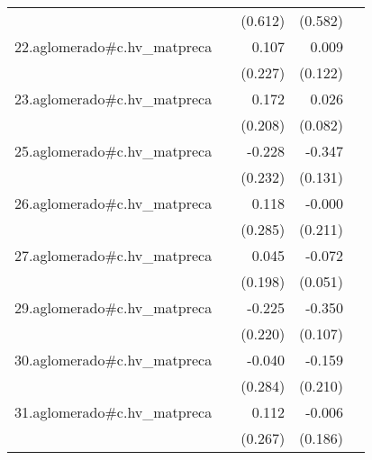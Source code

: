 {\begin{longtable}{l*{4}{D{.}{.}{-1}}}
            &                     &     (0.612)         &     (0.582)         &                     \\
\addlinespace
22.aglomerado#c.hv\_matpreca&                     &       0.107         &       0.009         &                     \\
            &                     &     (0.227)         &     (0.122)         &                     \\
\addlinespace
23.aglomerado#c.hv\_matpreca&                     &       0.172         &       0.026         &                     \\
            &                     &     (0.208)         &     (0.082)         &                     \\
\addlinespace
25.aglomerado#c.hv\_matpreca&                     &      -0.228         &      -0.347\sym{**} &                     \\
            &                     &     (0.232)         &     (0.131)         &                     \\
\addlinespace
26.aglomerado#c.hv\_matpreca&                     &       0.118         &      -0.000         &                     \\
            &                     &     (0.285)         &     (0.211)         &                     \\
\addlinespace
27.aglomerado#c.hv\_matpreca&                     &       0.045         &      -0.072         &                     \\
            &                     &     (0.198)         &     (0.051)         &                     \\
\addlinespace
29.aglomerado#c.hv\_matpreca&                     &      -0.225         &      -0.350\sym{**} &                     \\
            &                     &     (0.220)         &     (0.107)         &                     \\
\addlinespace
30.aglomerado#c.hv\_matpreca&                     &      -0.040         &      -0.159         &                     \\
            &                     &     (0.284)         &     (0.210)         &                     \\
\addlinespace
31.aglomerado#c.hv\_matpreca&                     &       0.112         &      -0.006         &                     \\
            &                     &     (0.267)         &     (0.186)         &                     \\

\end{longtable}}
